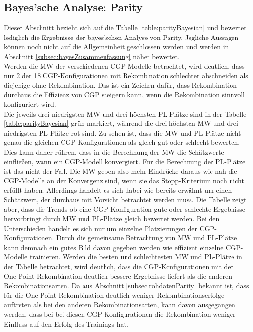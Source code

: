 \subsection{Bayes'sche Analyse: Parity}
\label{subsec:bayesParity}

Dieser Abschnitt bezieht sich auf die Tabelle \ref{table:parityBayesian} und bewertet lediglich die Ergebnisse der bayes'schen Analyse von Parity.
Jegliche Aussagen können noch nicht auf die Allgemeinheit geschlossen werden und werden in Abschnitt \ref{subsec:bayesZusammenfassung} näher bewertet.\\
Werden die MW der verschiedenen CGP-Modelle betrachtet, wird deutlich, dass nur 2 der 18 CGP-Konfigurationen mit Rekombination schlechter abschneiden als diejenige ohne Rekombination.
Das ist ein Zeichen dafür, dass Rekombination durchaus die Effizienz von CGP steigern kann, wenn die Rekombination sinnvoll konfiguriert wird.\\
Die jeweils drei niedrigsten MW und drei höchsten PL-Plätze sind in der Tabelle \ref{table:parityBayesian} grün markiert, während die drei höchsten MW und drei niedrigsten PL-Plätze rot sind.
Zu sehen ist, dass die MW und PL-Plätze nicht genau die gleichen CGP-Konfigurationen als gleich gut oder schlecht bewerten.
Dies kann daher rühren, dass in die Berechnung der MW die Schätzwerte einfließen, wann ein CGP-Modell konvergiert.
Für die Berechnung der PL-Plätze ist das nicht der Fall.
Die MW geben also mehr Eindrücke daraus wie nah die CGP-Modelle an der Konvergenz sind, wenn sie das Stopp-Kriterium noch nicht erfüllt haben.
Allerdings handelt es sich dabei wie bereits erwähnt um einen Schätzwert, der durchaus mit Vorsicht betrachtet werden muss.
Die Tabelle zeigt aber, dass die Trends ob eine CGP-Konfiguration gute oder schlechte Ergebnisse hervorbringt durch MW und PL-Plätze gleich bewertet werden.
Bei den Unterschieden handelt es sich nur um einzelne Platzierungen der CGP-Konfigurationen.
Durch die gemeinsame Betrachtung von MW und PL-Plätze kann demnach ein gutes Bild davon gegeben werden wie effizient einzelne CGP-Modelle trainieren.
Werden die besten und schlechtesten MW und PL-Plätze in der Tabelle betrachtet, wird deutlich, dass die CGP-Konfigurationen mit der One-Point Rekombination deutlich bessere Ergebnisse liefert als die anderen Rekombinationsarten.
Da aus Abschnitt \ref{subsec:rohdatenParity} bekannt ist, dass für die One-Point Rekombination deutlich weniger Rekombinationserfolge auftreten als bei den anderen Rekombinationsarten, kann davon ausgegangen werden, dass bei bei diesen CGP-Konfigurationen die Rekombination weniger Einfluss auf den Erfolg des Trainings hat.
